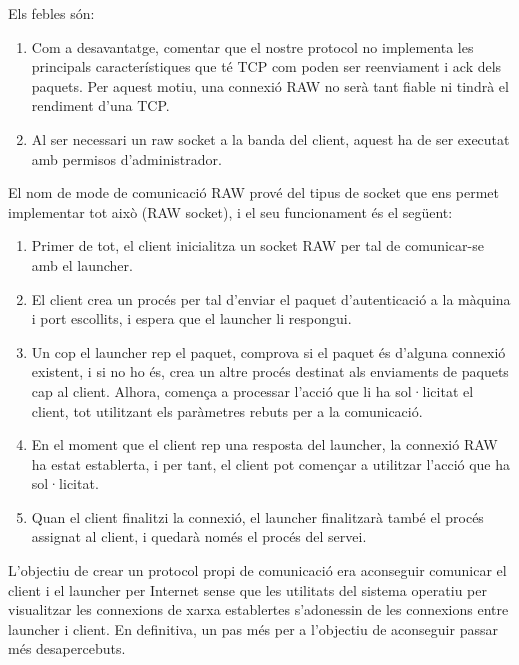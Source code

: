 Els febles són: \\
\begin{enumerate}
    \item Com a desavantatge, comentar que el nostre protocol no implementa les principals característiques que té TCP
        com poden ser reenviament i ack dels paquets. Per aquest motiu, una connexió RAW no serà tant
        fiable ni tindrà el rendiment d'una TCP. 
    \item Al ser necessari un raw socket a la banda del client, aquest ha de ser executat amb permisos d'administrador. \\
\end{enumerate}

El nom de mode de comunicació RAW prové del tipus de socket que ens permet implementar tot això (RAW socket),
i el seu funcionament és el següent: \\

\begin{enumerate}
    \item Primer de tot, el client inicialitza un socket RAW per tal de comunicar-se amb el launcher.
    \item El client crea un procés per tal d'enviar el paquet d'autenticació a la màquina i port escollits,
        i espera que el launcher li respongui.
    \item Un cop el launcher rep el paquet, comprova si el paquet és d'alguna connexió existent, i si no
        ho és, crea un altre procés destinat als enviaments de paquets cap al client. Alhora, comença a
        processar l'acció que li ha sol·licitat el client, tot utilitzant els paràmetres rebuts per a la 
        comunicació.
    \item En el moment que el client rep una resposta del launcher, la connexió RAW ha estat establerta, i 
        per tant, el client pot començar a utilitzar l'acció que ha sol·licitat.
    \item Quan el client finalitzi la connexió, el launcher finalitzarà també el procés assignat al client,
        i quedarà només el procés del servei.
\end{enumerate}

L'objectiu de crear un protocol propi de comunicació era aconseguir comunicar el client i el launcher per
Internet sense que les utilitats del sistema operatiu per visualitzar les connexions de xarxa establertes
s'adonessin de les connexions entre launcher i client. En definitiva, un pas més per a l'objectiu de aconseguir 
passar més desapercebuts. \\

